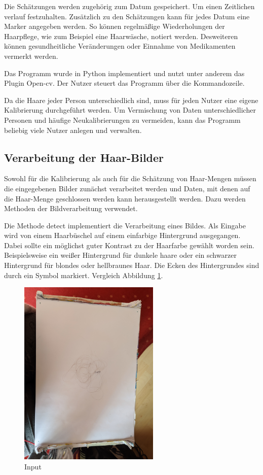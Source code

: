 \documentclass[german,a4paper,12pt,smallheadings,headsepline, titlepage, liststotoc, idextotoc,bibtoctoc,blibliography = totocnumbered]{scrartcl}
\begin{document}
Die Schätzungen werden zugehörig zum Datum gespeichert. Um einen Zeitlichen verlauf festzuhalten.
Zusätzlich zu den Schätzungen kann für jedes Datum eine Marker angegeben werden. So können regelmäßige Wiederholungen der Haarpflege, wie zum Beispiel eine Haarwäsche, notiert werden. Desweiteren können gesundheitliche Veränderungen oder Einnahme von Medikamenten vermerkt werden.

Das Programm wurde in Python implementiert und nutzt unter anderem das Plugin Open-cv.
Der Nutzer steuert das Programm über die Kommandozeile. 

Da die Haare jeder Person unterschiedlich sind, muss für jeden Nutzer eine eigene Kalibrierung durchgeführt werden. Um Vermischung von Daten unterschiedlicher Personen und häufige Neukalibrierungen zu vermeiden, kann das Programm beliebig viele Nutzer anlegen und verwalten. 

\subsection{Verarbeitung der Haar-Bilder}

Sowohl für die Kalibrierung als auch für die Schätzung von Haar-Mengen müssen die eingegebenen Bilder zunächst verarbeitet werden und Daten, mit denen auf die Haar-Menge geschlossen werden kann herausgestellt werden. Dazu werden Methoden der Bildverarbeitung verwendet.

Die Methode detect implementiert die Verarbeitung eines Bildes.
Als Eingabe wird von einem Haarbüschel auf einem einfarbige Hintergrund ausgegangen. Dabei sollte ein möglichst guter Kontrast zu der Haarfarbe gewählt worden sein. Beispielsweise ein weißer Hintergrund für dunkele haare oder ein schwarzer Hintergrund für blondes oder hellbraunes Haar. Die Ecken des Hintergrundes sind durch ein Symbol markiert. Vergleich Abbildung \ref{img:input}.

\begin{figure}[H]
	\centering
	\includegraphics[width=0.6\textwidth]{fig64/00IMG_20200406_153354_12_g_15.jpg}
	\caption[]{Input}
	\label{img:input}
\end{figure}
\end{document}

